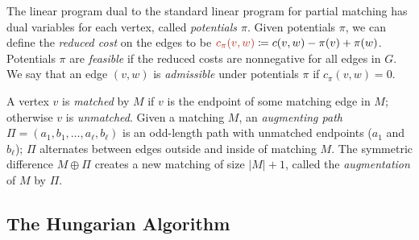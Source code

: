\documentclass[a4paper,UKenglish]{socg-lipics-v2018}
\makeatletter
\def\note#1{\textcolor{red}{{#1}}}
\def\abs#1{\mathopen| #1 \mathclose|}		%
\def\norm#1{\mathopen\| #1 \mathclose\|}	%
\theoremstyle{plain}
\numberwithin{figure}{section}
\def\EMPH#1{\textcolor{BrickRed}{{\emph{#1}}}}
\def\n@te#1{\textsf{\boldmath \textbf{$\langle\!\langle$#1$\rangle\!\rangle$}}\leavevmode}
\def\note#1{\textcolor{red}{\n@te{#1}}}
\makeatother
\begin{document}


The linear program dual to the standard linear program for partial matching has dual variables for
each vertex, called \EMPH{potentials $\pi$}.
Given potentials $\pi$, we can define the \EMPH{reduced cost} on the edges to be
$\EMPH{$c_\pi(v, w)$} \coloneqq c(v, w) - \pi(v) + \pi(w)$.
Potentials $\pi$ are \EMPH{feasible} if the reduced costs are nonnegative for all edges in $G$.
We say that an edge $(v, w)$ is \EMPH{admissible} under potentials $\pi$ if $c_\pi(v, w) = 0$.

A vertex $v$ is \EMPH{matched} by $M$ if $v$ is the endpoint of some matching edge in $M$;
otherwise $v$ is \EMPH{unmatched}.
Given a matching $M$, an \EMPH{augmenting path}
$\Pi = (a_1, b_1, \ldots, a_\ell, b_\ell)$ is an odd-length path with unmatched
endpoints ($a_1$ and $b_\ell$); $\Pi$ alternates between edges outside and inside of matching $M$.
The symmetric difference $M \oplus \Pi$ creates a new matching of size $\abs{M}+1$, called the \EMPH{augmentation} of $M$ by $\Pi$.

\subsection{The Hungarian Algorithm}
\end{document}
